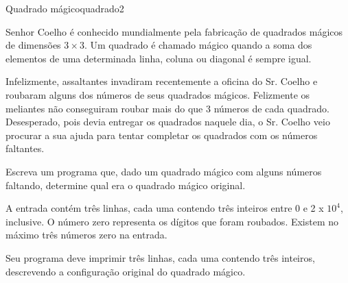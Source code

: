 \documentclass[12pt,a4paper,oneside]{article}
\begin{document}
\begin{problem}{Quadrado mágico}{quadrado}{2}

Senhor Coelho é conhecido mundialmente pela fabricação de quadrados mágicos de dimensões $3 \times 3$. Um quadrado é chamado mágico quando a soma dos elementos de uma determinada linha, coluna ou diagonal é sempre igual.

Infelizmente, assaltantes invadiram recentemente a oficina do Sr. Coelho e roubaram alguns dos números de seus quadrados mágicos. Felizmente os meliantes não conseguiram roubar mais do que 3 números de cada quadrado. Desesperado, pois devia entregar os quadrados naquele dia, o Sr. Coelho veio procurar a sua ajuda para tentar completar os quadrados com os números faltantes.

Escreva um programa que, dado um quadrado mágico com alguns números faltando, determine qual era o quadrado mágico original.


%

\InputFile

A entrada contém três linhas, cada uma contendo três inteiros entre 0 e 2 x ${10^4}$, inclusive. O número zero representa os dígitos que foram roubados. Existem no máximo três números zero na entrada.

\OutputFile

Seu programa deve imprimir três linhas, cada uma contendo três inteiros, descrevendo a configuração original do quadrado mágico.


\Example

\begin{example}
%
\end{example}

\begin{example}
%
\end{example}

\begin{example}
%
\end{example}


\end{problem}
\end{document}
